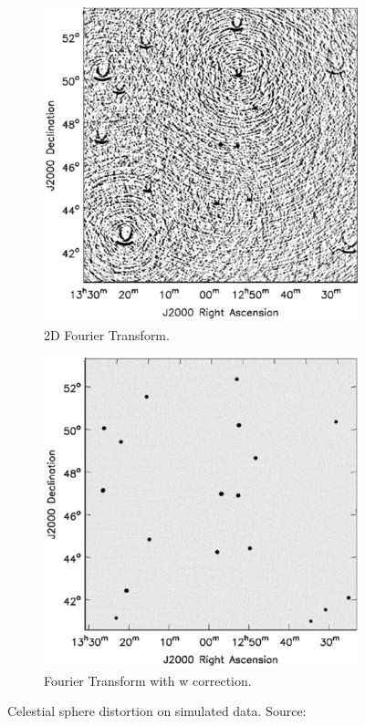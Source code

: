 \begin{figure}[h]
	\centering
	\begin{subfigure}[b]{0.45\linewidth}
		\includegraphics[width=\linewidth]{./chapters/03.challenges/w-no-correction.png}
		\caption{2D Fourier Transform.}
		\label{meerkat:2dfft}
	\end{subfigure}
	\begin{subfigure}[b]{0.45\linewidth}
		\includegraphics[width=\linewidth]{./chapters/03.challenges/w-correction.png}
		\caption{Fourier Transform with w correction.}
		\label{meerkat:wcorrection}
	\end{subfigure}
	\caption{Celestial sphere distortion on simulated data. Source: \cite{cornwell2008noncoplanar}}
	\label{meerkat:wdistortion}
\end{figure}


